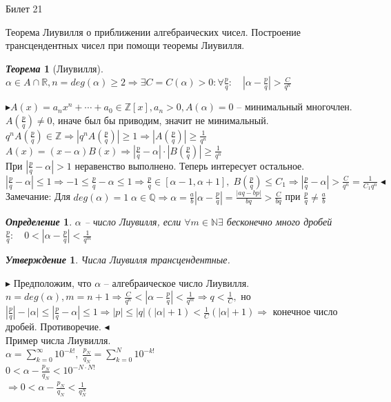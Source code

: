 \documentclass[a4paper,12pt]{article}
\newtheorem{deff}{\textit{Определение}}
\newtheorem{teo}{\textit{Теорема}}
\newtheorem{utv}{\textit{Утверждение}}
\newcommand{\AL}{\alpha}
\newcommand{\q}{\quad}
\newcommand{\pb}{\blacktriangleright}
\newcommand{\pe}{\blacktriangleleft}
\newcommand{\Ra}{\Rightarrow}
\newcommand{\bb}[1]{\mathbb{#1}}
\newcommand{\SL}{\sum\limits}
\begin{document}
\newpage
\begin{mybox}{\hypertarget{bil21}{Билет 21}}

\begin{formbox}{}
Теорема Лиувилля о приближении алгебраических чисел. Построение трансцендентных чисел при помощи теоремы Лиувилля.
\end{formbox}

\begin{formbox}{}
\begin{teo} [Лиувилля] $\AL \in A\cap \bb{R}, n = deg(\AL) \ge 2\Ra \exists C = C(\AL) > 0: \forall \frac{p}{q}:\q \left|\AL - \frac{p}{q} \right| > \frac{C}{q^n} $
\end{teo}
\end{formbox}
$\pb A(x) = a_nx^n +\cdots + a_0 \in \bb{Z}[x], a_n > 0, A(\AL) = 0 $ -- минимальный многочлен.\\
$A(\frac{p}{q})\not=0$, иначе был бы приводим, значит не минимальный.\\
$q^n A(\frac{p}{q}) \in\bb{Z}\Ra |q^n A(\frac{p}{q})| \ge 1 \Ra |A(\frac{p}{q})| \ge \frac{1}{q^n}$\\
$A(x) = (x-\AL)B(x)\Ra \left| \frac{p}{q} - \AL\right| \cdot |B(\frac{p}{q})| \ge \frac{1}{q^n}$\\
При $\left| \frac{p}{q} - \AL\right| > 1$ неравенство выполнено. Теперь интересует остальное.\\
$\left| \frac{p}{q} - \AL\right| \le 1\Ra -1 \le \frac{p}{q} - \AL \le 1\Ra \frac{p}{q}\in[\AL-1, \AL+1], \; B(\frac{p}{q}) \le C_1\Ra \left| \frac{p}{q} - \AL\right| > \frac{C}{q^n} = \frac{1}{C_1 q^n} \pe$\\
Замечание: Для $deg(\AL) = 1\; \AL\in\bb{Q}\Ra \AL = \frac{a}{b} \left| \AL - \frac{p}{q} \right| = \frac{|aq - bp|}{bq} > \frac{C}{bq} $ при $\frac{p}{q} \not=\frac{a}{b}$
\begin{formbox}{}
\begin{deff} $\AL$ -- число Лиувилля, если $\forall m\in\bb{N} \exists$ бесконечно много дробей $\frac{p}{q}: \q 0 < |\AL - \frac{p}{q}| < \frac{1}{q^m}$
\end{deff}
\end{formbox}

\begin{formbox}{}
\begin{utv} Числа Лиувилля трансцендентные.
\end{utv}
\end{formbox}
$\pb$ Предположим, что $\AL$ -- алгебраическое число Лиувилля. $n = deg(\AL), m = n+1\Ra \frac{C}{q^n}< |\AL - \frac{p}{q}| < \frac{1}{q^m}\Ra q<\frac{1}{C},$ но $|\frac{p}{q}| - |\AL| \le |\frac{p}{q} - \AL| \le 1\Ra |p| \le |q|(|\AL| + 1) < \frac{1}{C} (|\AL| + 1)\Ra$ конечное число дробей. Противоречие. $\pe$\\
Пример числа Лиувилля.\\
$\AL = \SL_{k=0}^\infty 10^{-k!},\;\frac{p_N}{q_N} = \SL_{k=0}^N 10^{-k!}$\\
$0 < \AL - \frac{p_N}{q_N} < 10^{-N\cdot N!}$\\
$\Ra 0 < \AL - \frac{p_N}{q_N} < \frac{1}{q_N^N} $


\end{mybox}
\end{document}
